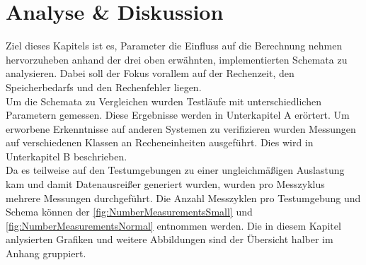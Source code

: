 \section{Analyse \& Diskussion}
\label{sec:analyse_diskussion}
Ziel dieses Kapitels ist es, Parameter die Einfluss auf die Berechnung nehmen hervorzuheben anhand der drei oben erwähnten, implementierten Schemata zu analysieren. Dabei soll der Fokus vorallem auf der Rechenzeit, den Speicherbedarfs und den Rechenfehler liegen. \\ Um die Schemata zu Vergleichen wurden Testläufe mit unterschiedlichen Parametern gemessen. Diese Ergebnisse werden in Unterkapitel A erörtert. Um erworbene Erkenntnisse auf anderen Systemen zu verifizieren wurden Messungen auf verschiedenen Klassen an Recheneinheiten ausgeführt. Dies wird in Unterkapitel B beschrieben. \\ Da es teilweise auf den Testumgebungen zu einer ungleichmäßigen Auslastung kam und damit Datenausreißer generiert wurden, wurden pro Messzyklus mehrere Messungen durchgeführt. Die Anzahl Messzyklen pro Testumgebung und Schema können der \autoref{fig:NumberMeasurementsSmall} und \autoref{fig:NumberMeasurementsNormal} entnommen werden. Die in diesem Kapitel anlysierten Grafiken und weitere Abbildungen sind der \"Ubersicht halber im Anhang gruppiert.

